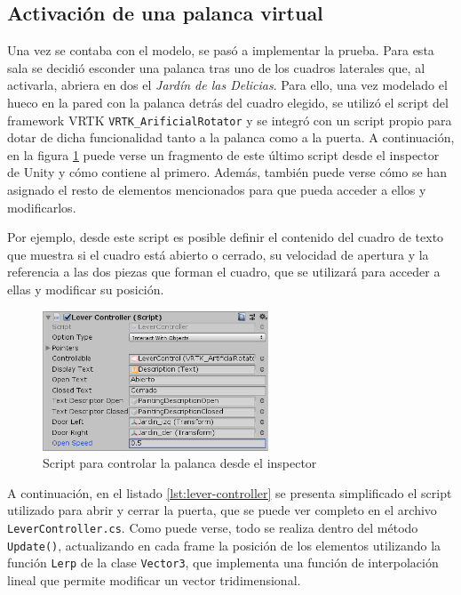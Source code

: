 \subsection{Activación de una palanca virtual}

Una vez se contaba con el modelo, se pasó a implementar la prueba. Para esta sala se decidió esconder una palanca tras uno de los cuadros laterales que, al activarla, abriera en dos el \textit{Jardín de las Delicias}. Para ello, una vez modelado el hueco en la pared con la palanca detrás del cuadro elegido, se utilizó el script del framework \acs{VRTK} \texttt{VRTK\_ArificialRotator} y se integró con un script propio para dotar de dicha funcionalidad tanto a la palanca como a la puerta. A continuación, en la figura \ref{fig:lever-controller-inspector} puede verse un fragmento de este último script desde el inspector de Unity y cómo contiene al primero. Además, también puede verse cómo se han asignado el resto de elementos mencionados para que pueda acceder a ellos y modificarlos.

Por ejemplo, desde este script es posible definir el contenido del cuadro de texto que muestra si el cuadro está abierto o cerrado, su velocidad de apertura y la referencia a las dos piezas que forman el cuadro, que se utilizará para acceder a ellas y modificar su posición.

\begin{figure}[!h]
\begin{center}
\includegraphics[width=0.6\textwidth]{imagenes/7/lever-controller.png}
\caption{Script para controlar la palanca desde el inspector}
\label{fig:lever-controller-inspector}
\end{center}
\end{figure}

A continuación, en el listado \ref{lst:lever-controller} se presenta simplificado el script utilizado para abrir y cerrar la puerta, que se puede ver completo en el archivo \texttt{LeverController.cs}. Como puede verse, todo se realiza dentro del método \texttt{Update()}, actualizando en cada frame la posición de los elementos utilizando la función \texttt{Lerp} de la clase \texttt{Vector3}, que implementa una función de interpolación lineal que permite modificar un vector tridimensional.


